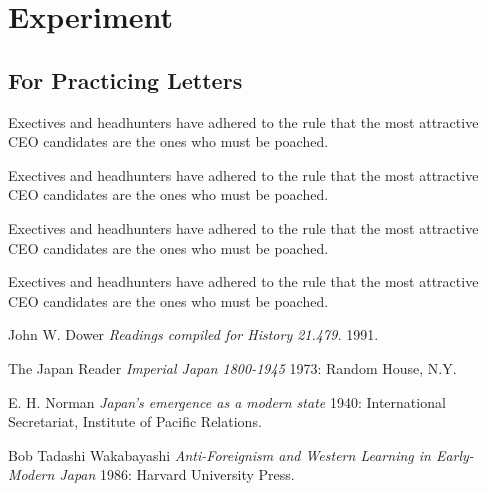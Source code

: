 \chapter{Experiment}

\section{For Practicing Letters}

\makeatletter


\def\big@para{\futurelet\big@nextchar\augment@char}
\def\augment@char{%
    \leavevmode\lower1ex\hbox{\Huge\big@nextchar}\omit@first}
\def\omit@first#1{\relax}

\everypar{\hskip-\parindent\big@para}
Exectives and headhunters have adhered to the rule that 
the most attractive CEO candidates are the ones who must be poached.

Exectives and headhunters have adhered to the rule that 
the most attractive CEO candidates are the ones who must be poached.

Exectives and headhunters have adhered to the rule that 
the most attractive CEO candidates are the ones who must be poached.

Exectives and headhunters have adhered to the rule that 
the most attractive CEO candidates are the ones who must be poached.\cite{impj}



\begin{thebibliography}{1}

 John W. Dower {\em Readings compiled for History
21.479.}  1991.

  The Japan Reader {\em Imperial Japan 1800-1945} 1973:
Random House, N.Y.

 E. H. Norman {\em Japan's emergence as a modern
state} 1940: International Secretariat, Institute of Pacific
Relations.

 Bob Tadashi Wakabayashi {\em Anti-Foreignism and Western
Learning in Early-Modern Japan} 1986: Harvard University Press.

\end{thebibliography}

\makeatother